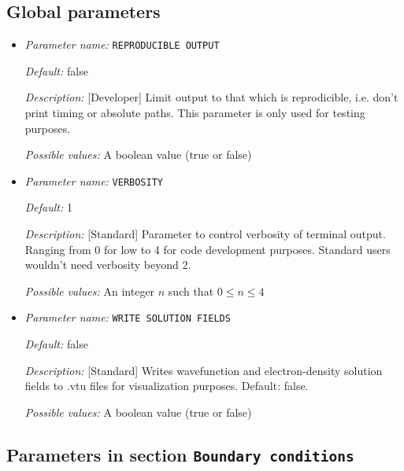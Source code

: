 \subsection{Global parameters}
\label{parameters:global}


\begin{itemize}
\item {\it Parameter name:} {\tt REPRODUCIBLE OUTPUT}
\label{parameters:REPRODUCIBLE OUTPUT}
\label{parameters:REPRODUCIBLE_20OUTPUT}




{\it Default:} false


{\it Description:} [Developer] Limit output to that which is reprodicible, i.e. don't print timing or absolute paths. This parameter is only used for testing purposes.


{\it Possible values:} A boolean value (true or false)
\item {\it Parameter name:} {\tt VERBOSITY}
\label{parameters:VERBOSITY}




{\it Default:} 1


{\it Description:} [Standard] Parameter to control verbosity of terminal output. Ranging from 0 for low to 4 for code development purposes. Standard users wouldn't need verbosity beyond 2.


{\it Possible values:} An integer $n$ such that $0\leq n \leq 4$
\item {\it Parameter name:} {\tt WRITE SOLUTION FIELDS}
\label{parameters:WRITE SOLUTION FIELDS}
\label{parameters:WRITE_20SOLUTION_20FIELDS}




{\it Default:} false


{\it Description:} [Standard] Writes wavefunction and electron-density solution fields to .vtu files for visualization purposes. Default: false.


{\it Possible values:} A boolean value (true or false)
\end{itemize}



\subsection{Parameters in section \tt Boundary conditions}
\label{parameters:Boundary_20conditions}

